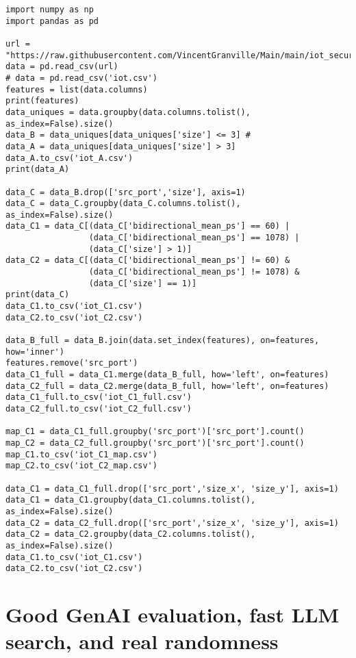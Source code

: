 \documentclass[oneside,10pt]{book}
\begin{document}
\begin{lstlisting}
import numpy as np
import pandas as pd

url = "https://raw.githubusercontent.com/VincentGranville/Main/main/iot_security.csv"
data = pd.read_csv(url) 
# data = pd.read_csv('iot.csv')
features = list(data.columns)
print(features)
data_uniques = data.groupby(data.columns.tolist(), as_index=False).size()
data_B = data_uniques[data_uniques['size'] <= 3] #
data_A = data_uniques[data_uniques['size'] > 3]
data_A.to_csv('iot_A.csv')
print(data_A)

data_C = data_B.drop(['src_port','size'], axis=1) 
data_C = data_C.groupby(data_C.columns.tolist(), as_index=False).size()
data_C1 = data_C[(data_C['bidirectional_mean_ps'] == 60) | 
                 (data_C['bidirectional_mean_ps'] == 1078) |
                 (data_C['size'] > 1)]
data_C2 = data_C[(data_C['bidirectional_mean_ps'] != 60) & 
                 (data_C['bidirectional_mean_ps'] != 1078) &
                 (data_C['size'] == 1)]
print(data_C)
data_C1.to_csv('iot_C1.csv')
data_C2.to_csv('iot_C2.csv')

data_B_full = data_B.join(data.set_index(features), on=features, how='inner') 
features.remove('src_port')
data_C1_full = data_C1.merge(data_B_full, how='left', on=features) 
data_C2_full = data_C2.merge(data_B_full, how='left', on=features) 
data_C1_full.to_csv('iot_C1_full.csv')
data_C2_full.to_csv('iot_C2_full.csv')

map_C1 = data_C1_full.groupby('src_port')['src_port'].count()
map_C2 = data_C2_full.groupby('src_port')['src_port'].count()
map_C1.to_csv('iot_C1_map.csv')
map_C2.to_csv('iot_C2_map.csv')

data_C1 = data_C1_full.drop(['src_port','size_x', 'size_y'], axis=1)
data_C1 = data_C1.groupby(data_C1.columns.tolist(), as_index=False).size()
data_C2 = data_C2_full.drop(['src_port','size_x', 'size_y'], axis=1)
data_C2 = data_C2.groupby(data_C2.columns.tolist(), as_index=False).size()
data_C1.to_csv('iot_C1.csv')
data_C2.to_csv('iot_C2.csv')
\end{lstlisting}

\section{Good GenAI evaluation, fast LLM search, and real randomness}\label{radixdw8}
\end{document}
